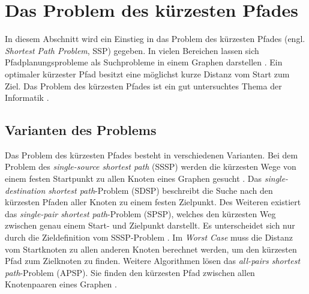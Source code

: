 \chapter{Das Problem des kürzesten Pfades}
\label{spp}
In diesem Abschnitt wird ein Einstieg in das Problem des kürzesten Pfades (engl. \textit{Shortest Path Problem}, SSP) gegeben. In vielen Bereichen lassen sich Pfadplanungsprobleme als Suchprobleme in einem Graphen darstellen \cite{HartNilssonandRaphael.1968}. Ein optimaler kürzester Pfad besitzt eine möglichst kurze Distanz vom Start zum Ziel. Das Problem des kürzesten Pfades ist ein gut untersuchtes Thema der Informatik \cite[S.1]{Madkour.2017}.


\section{Varianten des Problems}

Das Problem des kürzesten Pfades besteht in verschiedenen Varianten. Bei dem Problem des \textit{single-source shortest path} (SSSP) werden die kürzesten Wege von einem festen Startpunkt zu allen Knoten eines Graphen gesucht \cite[S.644]{Cormen.2009}. Das \textit{single-destination shortest path}-Problem (SDSP)  beschreibt die Suche nach den kürzesten Pfaden aller Knoten zu einem festen Zielpunkt. Des Weiteren existiert das \textit{single-pair shortest path}-Problem (SPSP), welches den kürzesten Weg zwischen genau einem Start- und Zielpunkt darstellt. Es unterscheidet sich nur durch die Zieldefinition vom SSSP-Problem \cite{Ottmann.2017}. Im \textit{Worst Case} muss die Distanz vom Startknoten zu allen anderen Knoten berechnet werden, um den kürzesten Pfad zum Zielknoten zu finden. Weitere Algorithmen lösen das \textit{all-pairs shortest path}-Problem (APSP). Sie finden den kürzesten Pfad zwischen allen Knotenpaaren eines Graphen \cite[S.644]{Cormen.2009}.


